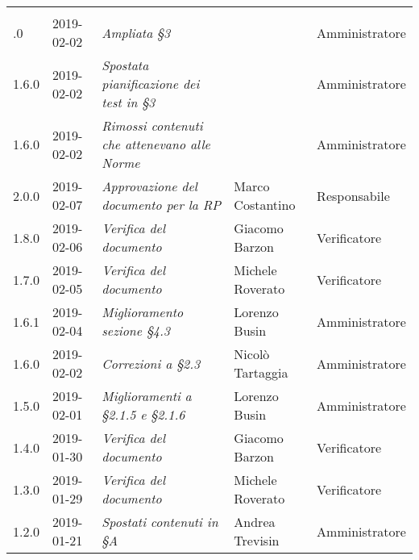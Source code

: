 \newpage 
\section*{}
	\begin{longtable}{C{2cm}|C{2.5cm}|C{4.5cm}|C{2.5cm}|C{3cm}}

	 &  &  &  &   \\
	.0 & 2019-02-02 & \emph{Ampliata §3} &  & Amministratore \\
		\hline
	
		1.6.0 & 2019-02-02 & \emph{Spostata pianificazione dei test in §3} &  & Amministratore \\
		\hline
	
		1.6.0 & 2019-02-02 & \emph{Rimossi contenuti che attenevano alle Norme} &  & Amministratore \\
		\hline
	
		2.0.0 & 2019-02-07 & \emph{Approvazione del documento per la RP} & Marco Costantino & Responsabile \\
		\hline
	
		1.8.0 & 2019-02-06 & \emph{Verifica del documento} & Giacomo Barzon & Verificatore \\
		\hline
		
		1.7.0 & 2019-02-05 & \emph{Verifica del documento} & Michele Roverato & Verificatore \\
		\hline
	
		1.6.1 & 2019-02-04 & \emph{Miglioramento sezione §4.3} & Lorenzo Busin & Amministratore \\
		\hline
		
		1.6.0 & 2019-02-02 & \emph{Correzioni a §2.3} & Nicolò Tartaggia & Amministratore \\
		\hline
	
		1.5.0 & 2019-02-01 & \emph{Miglioramenti a  §2.1.5 e §2.1.6} & Lorenzo Busin & Amministratore \\
		\hline
	
		1.4.0 & 2019-01-30 & \emph{Verifica del documento} & Giacomo Barzon & Verificatore \\
		\hline
		
		1.3.0 & 2019-01-29 & \emph{Verifica del documento} & Michele Roverato & Verificatore \\
		\hline
		
		1.2.0 & 2019-01-21 & \emph{Spostati contenuti in §A} & Andrea Trevisin & Amministratore \\
		\hline
	

\end{longtable}
